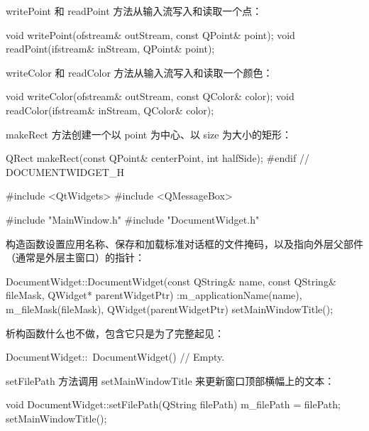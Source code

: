 writePoint 和 readPoint 方法从输入流写入和读取一个点：

\begin{codebox}
void writePoint(ofstream& outStream, const QPoint& point);
void readPoint(ifstream& inStream, QPoint& point);
\end{codebox}

writeColor 和 readColor 方法从输入流写入和读取一个颜色：

\begin{codebox}
void writeColor(ofstream& outStream, const QColor& color);
void readColor(ifstream& inStream, QColor& color);
\end{codebox}

makeRect 方法创建一个以 point 为中心、以 size 为大小的矩形：

\begin{codebox}
QRect makeRect(const QPoint& centerPoint, int halfSide);
#endif // DOCUMENTWIDGET_H
\end{codebox}

\medskip{}

\begin{codebox}
#include <QtWidgets>
#include <QMessageBox>

#include "MainWindow.h"
#include "DocumentWidget.h"
\end{codebox}

构造函数设置应用名称、保存和加载标准对话框的文件掩码，以及指向外层父部件（通常是外层主窗口）的指针：

\begin{codebox}
DocumentWidget::DocumentWidget(const QString& name,
                const QString& fileMask, QWidget* parentWidgetPtr)
 :m_applicationName(name),
  m_fileMask(fileMask),
  QWidget(parentWidgetPtr) {
  setMainWindowTitle();
}
\end{codebox}

析构函数什么也不做，包含它只是为了完整起见：

\begin{codebox}
DocumentWidget::~DocumentWidget() {
  // Empty.
}
\end{codebox}

setFilePath 方法调用 setMainWindowTitle 来更新窗口顶部横幅上的文本：

\begin{codebox}
void DocumentWidget::setFilePath(QString filePath) {
  m_filePath = filePath;
  setMainWindowTitle();
}
\end{codebox}

